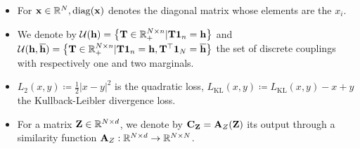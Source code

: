 \begin{itemize}
    \item For ${\mathbf{x}} \in \mathbb{R}^{N}, \operatorname{diag}({\mathbf{x}})$ denotes the diagonal matrix whose elements are the $x_i$.
    \item We denote by ${\mathcal{U}}({\mathbf{h}}) = \left\{ {\mathbf{T}} \in \mathbb{R}_+^{N \times n} | {\mathbf{T}} \bm{1}_n = {\mathbf{h}} \right\}$ and ${\mathcal{U}}({\mathbf{h}}, \overline{{\mathbf{h}}}) = \left\{ {\mathbf{T}} \in \mathbb{R}_+^{N \times n} | {\mathbf{T}} \bm{1}_n = {\mathbf{h}}, {\mathbf{T}}^\top \bm{1}_N = \overline{{\mathbf{h}}} \right\}$ the set of discrete couplings with respectively one and two marginals.
    \item $L_2(x,y) \coloneqq \frac{1}{2} |x - y|^2$ is the quadratic loss,  $L_{\mathrm{KL}}(x,y) \coloneqq L_{\mathrm{KL}}(x,y) - x + y $ the Kullback-Leibler divergence loss.
    \item For a matrix ${\mathbf{Z}} \in \mathbb{R}^{N \times d}$, we denote by ${\mathbf{C}}_{{\mathbf{Z}}} =  {\mathbf{A}}_{Z}({\mathbf{Z}})$ its output through a similarity function ${\mathbf{A}}_{Z}: \mathbb{R}^{N \times d} \to \mathbb{R}^{N \times N}$.
\end{itemize}